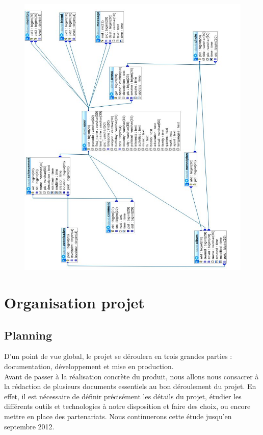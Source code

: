 \documentclass{life-fr}
\begin{document}
\begin{figure}[H]
  \begin{center}
    \includegraphics[width=18cm]{img/imgdb.jpg}
  \end{center}
\end{figure}

\chapter{Organisation projet}

\section{Planning}

D'un point de vue global, le projet se déroulera en trois grandes parties : documentation, développement et mise en production.\\

Avant de passer à la réalisation concrète du produit, nous allons nous consacrer à la rédaction de plusieurs documents essentiels au bon déroulement du projet. En effet, il est nécessaire de définir précisément les détails du projet, étudier les différents outils et technologies à notre disposition et faire des choix, ou encore mettre en place des partenariats. Nous continuerons cette étude jusqu'en septembre 2012.\\
\end{document}
